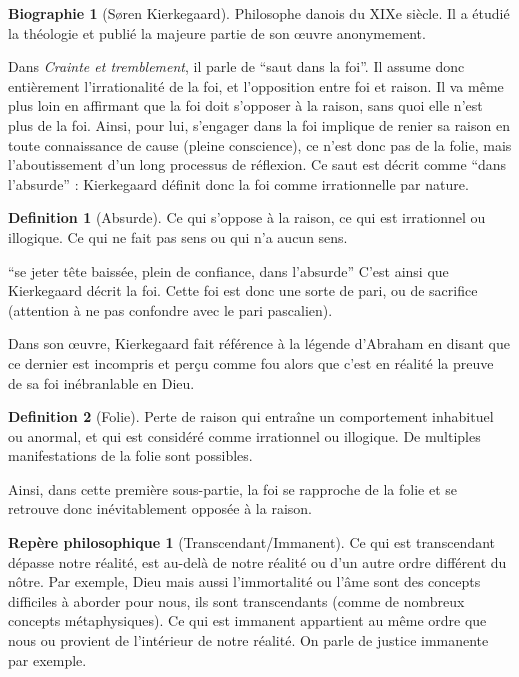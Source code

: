 \documentclass[french]{book}
\theoremstyle{definition}
\newtheorem*{dfn}{Definition}
\newtheorem*{rep}{Repère philosophique}
\newtheorem*{bio}{Biographie}
\begin{document}
\begin{bio}[Søren Kierkegaard]
	Philosophe danois du XIXe siècle. Il a étudié la théologie et publié la majeure partie de son œuvre anonymement.
\end{bio}

Dans \textit{Crainte et tremblement}, il  parle de “saut dans la foi”. Il assume donc entièrement l’irrationalité de la foi, et l’opposition entre foi et raison. Il va même plus loin en affirmant que la foi doit s’opposer à la raison, sans quoi elle n’est plus de la foi. Ainsi, pour lui, s'engager dans la foi implique de renier sa raison en toute connaissance de cause (pleine conscience), ce n’est donc pas de la folie, mais l’aboutissement d’un long processus de réflexion. Ce saut est décrit comme “dans l’absurde” : Kierkegaard définit donc la foi comme irrationnelle par nature.

\begin{dfn}[Absurde]
Ce qui s’oppose à la raison, ce qui est irrationnel ou illogique. Ce qui ne fait pas sens ou qui n’a aucun sens. 
\end{dfn}

“se jeter tête baissée, plein de confiance, dans l’absurde” 
C’est ainsi que Kierkegaard décrit la foi. Cette foi est donc une sorte de pari, ou de sacrifice (attention à ne pas confondre avec le pari pascalien).

Dans son œuvre, Kierkegaard fait référence à la légende d’Abraham en disant que ce dernier est incompris et perçu comme fou alors que c’est en réalité la preuve de sa foi inébranlable en Dieu.

\begin{dfn}[Folie]
Perte de raison qui entraîne un comportement inhabituel ou anormal, et qui est considéré comme irrationnel ou illogique. De multiples manifestations de la folie sont possibles.
\end{dfn}

Ainsi, dans cette première sous-partie, la foi se rapproche de la folie et se retrouve donc inévitablement opposée à la raison.

\begin{rep}[Transcendant/Immanent]
Ce qui est transcendant dépasse notre réalité, est au-delà de notre réalité ou d’un autre ordre différent du nôtre. Par exemple, Dieu mais aussi l'immortalité ou l’âme sont des concepts difficiles à aborder pour nous, ils sont transcendants (comme de nombreux concepts métaphysiques).
Ce qui est immanent appartient au même ordre que nous ou provient de l’intérieur de notre réalité. On parle de justice immanente par exemple.
\end{rep}
\end{document}
